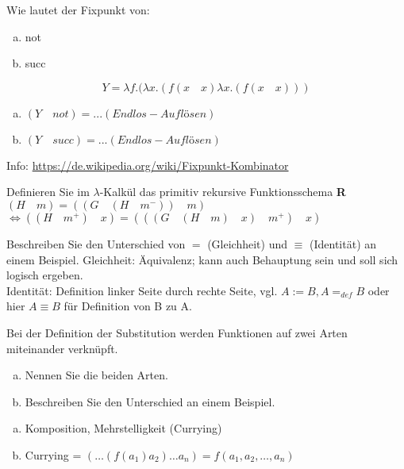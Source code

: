 \begin{card}
	Wie lautet der Fixpunkt von:
	\begin{enumerate}[a)]
    \item not
    \item succ
	\end{enumerate}
	\hr
  \[Y = \lambda f.(\lambda x.(f(x \quad x) \lambda x.(f(x \quad x)))\]
	\begin{enumerate}[a)]
    \item $(Y \quad not) = ... (Endlos-Auflösen)$
    \item $(Y \quad succ) = ... (Endlos-Auflösen)$
	\end{enumerate}
	Info: \url{https://de.wikipedia.org/wiki/Fixpunkt-Kombinator}
\end{card}

\begin{card}
	Definieren Sie im $\lambda$-Kalkül das primitiv rekursive Funktionsschema \textbf{R}
	\hr
  $(H \quad m) = ((G \quad (H \quad m^-)) \quad m)$\\
  $\Leftrightarrow ((H \quad m^+) \quad x) = (((G \quad (H \quad m) \quad x) \quad m^+) \quad x)$
\end{card}

\begin{card}
	Beschreiben Sie den Unterschied von $=$ (Gleichheit) und $\equiv$ (Identität) an einem Beispiel.
	\hr
	Gleichheit: Äquivalenz; kann auch Behauptung sein und soll sich logisch ergeben.\\
	Identität: Definition linker Seite durch rechte Seite, vgl. $A := B, A=_{def} B$ oder hier $A \equiv B $ für Definition von B zu A.
\end{card}

\begin{card}
	Bei der Definition der Substitution werden Funktionen auf zwei Arten miteinander verknüpft.
  \begin{enumerate}[a)]
	  \item Nennen Sie die beiden Arten.
	  \item Beschreiben Sie den Unterschied an einem Beispiel.
	\end{enumerate}
	\hr
  \begin{enumerate}[a)]
	  \item Komposition, Mehrstelligkeit (Currying)
	  \item Currying = $(\dots (f(a_1)a_2) \dots a_n) = f(a_1,a_2, \dots, a_n)$
	\end{enumerate}
\end{card}
